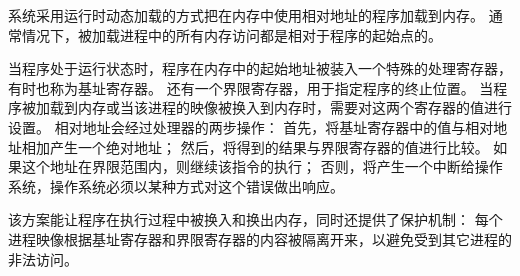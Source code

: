 {{        系统采用运行时动态加载的方式把在内存中使用相对地址的程序加载到内存。
        通常情况下，被加载进程中的所有内存访问都是相对于程序的起始点的。

        当程序处于运行状态时，程序在内存中的起始地址被装入一个特殊的处理寄存器，有时也称为基址寄存器。
        还有一个界限寄存器，用于指定程序的终止位置。
        当程序被加载到内存或当该进程的映像被换入到内存时，需要对这两个寄存器的值进行设置。
        相对地址会经过处理器的两步操作：
        首先，将基址寄存器中的值与相对地址相加产生一个绝对地址；
        然后，将得到的结果与界限寄存器的值进行比较。
        如果这个地址在界限范围内，则继续该指令的执行；
        否则，将产生一个中断给操作系统，操作系统必须以某种方式对这个错误做出响应。

        该方案能让程序在执行过程中被换入和换出内存，同时还提供了保护机制：
        每个进程映像根据基址寄存器和界限寄存器的内容被隔离开来，以避免受到其它进程的非法访问。
    }
}
